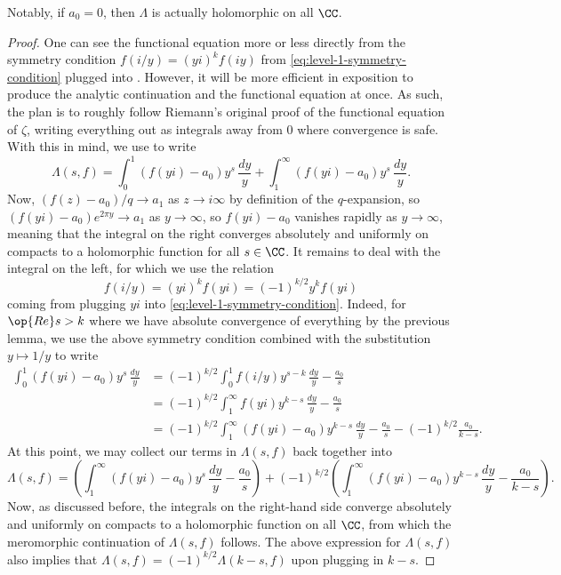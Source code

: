 \documentclass{amsart}
\begin{document}
Notably, if $a_0=0$, then $\Lambda$ is actually holomorphic on all $\CC$.
\begin{proof}
	One can see the functional equation more or less directly from the symmetry condition $f(i/y)=(yi)^kf(iy)$ from \eqref{eq:level-1-symmetry-condition} plugged into . However, it will be more efficient in exposition to produce the analytic continuation and the functional equation at once. As such, the plan is to roughly follow Riemann's original proof of the functional equation of $\zeta$, writing everything out as integrals away from $0$ where convergence is safe. With this in mind, we use  to write
	\[\Lambda(s,f)=\int_0^1(f(yi)-a_0)y^s\,\frac{dy}y+\int_1^\infty(f(yi)-a_0)y^s\,\frac{dy}y.\]
	Now, $(f(z)-a_0)/q\to a_1$ as $z\to i\infty$ by definition of the $q$-expansion, so $(f(yi)-a_0)e^{2\pi y}\to a_1$ as $y\to\infty$, so $f(yi)-a_0$ vanishes rapidly as $y\to\infty$, meaning that the integral on the right converges absolutely and uniformly on compacts to a holomorphic function for all $s\in\CC$. It remains to deal with the integral on the left, for which we use the relation
	\[f(i/y)=(yi)^kf(yi)=(-1)^{k/2}y^kf(yi)\]
	coming from plugging $yi$ into \eqref{eq:level-1-symmetry-condition}. Indeed, for $\op{Re}s>k$ where we have absolute convergence of everything by the previous lemma, we use the above symmetry condition combined with the substitution $y\mapsto1/y$ to write
	\begin{align*}
		\int_0^1(f(yi)-a_0)y^s\,\frac{dy}y &= (-1)^{k/2}\int_0^1f(i/y)y^{s-k}\,\frac{dy}y-\frac{a_0}s \\
		&= (-1)^{k/2}\int_1^\infty f(yi)y^{k-s}\,\frac{dy}y-\frac{a_0}s \\
		&= (-1)^{k/2}\int_1^\infty(f(yi)-a_0)y^{k-s}\,\frac{dy}y-\frac{a_0}s-(-1)^{k/2}\frac{a_0}{k-s}.
	\end{align*}
	At this point, we may collect our terms in $\Lambda(s,f)$ back together into
	\[\Lambda(s,f)=\left(\int_1^\infty(f(yi)-a_0)y^s\,\frac{dy}y-\frac{a_0}s\right)+(-1)^{k/2}\left(\int_1^\infty(f(yi)-a_0)y^{k-s}\,\frac{dy}y-\frac{a_0}{k-s}\right).\]
	Now, as discussed before, the integrals on the right-hand side converge absolutely and uniformly on compacts to a holomorphic function on all $\CC$, from which the meromorphic continuation of $\Lambda(s,f)$ follows. The above expression for $\Lambda(s,f)$ also implies that $\Lambda(s,f)=(-1)^{k/2}\Lambda(k-s,f)$ upon plugging in $k-s$.
\end{proof}
\end{document}
